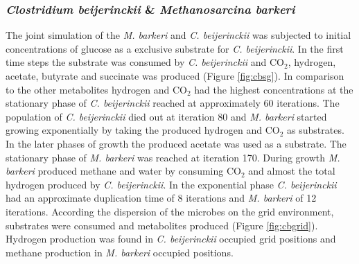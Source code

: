 \subsubsection{\textit{Clostridium beijerinckii} \& \textit{Methanosarcina barkeri}}
The joint simulation of the \textit{M. barkeri} and \textit{C. beijerinckii} was subjected to initial concentrations of glucose as a exclusive substrate for \textit{C. beijerinckii}. In the first time steps the substrate was consumed by \textit{C. beijerinckii} and CO$_2$, hydrogen, acetate, butyrate and succinate was produced (Figure \hyperref[fig:cbsg]{\ref{fig:cbsg}}). 
In comparison to the other metabolites hydrogen and CO$_2$ had the highest concentrations at the stationary phase of \textit{C. beijerinckii} reached at approximately 60 iterations. The population of \textit{C. beijerinckii} died out at iteration 80 and \textit{M. barkeri} started growing exponentially by taking the produced hydrogen and CO$_2$ as substrates. 
In the later phases of growth the produced acetate was used as a substrate. The stationary phase of \textit{M. barkeri} was reached at iteration 170. 
During growth \textit{M. barkeri} produced methane and water by consuming CO$_2$ and almost the total hydrogen produced by \textit{C. beijerinckii}. 
In the exponential phase \textit{C. beijerinckii} had an approximate duplication time of 8 iterations and \textit{M. barkeri} of 12 iterations.
According the dispersion of the microbes on the grid environment, substrates were consumed and metabolites produced (Figure \hyperref[fig:cbgrid]{\ref{fig:cbgrid}}). Hydrogen production was found in \textit{C. beijerinckii} occupied grid positions and methane production in \textit{M. barkeri} occupied positions.
